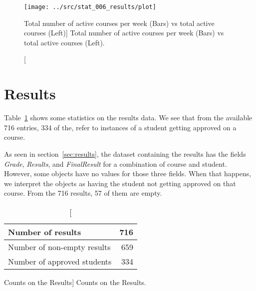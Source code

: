 \begin{figure}[h!]
    \centering

    \texttt{[image: ../src/stat\_006\_results/plot]}

    \caption
        [Total number of active courses per week (Bars) vs total active courses (Left)]
        {Total number of active courses per week (Bars) vs total active courses (Left).}

    \label{fig:stat_006}
\end{figure}

\section{Results}

Table~\ref{tab:results_stats} shows some statistics on the results data. We see
that from the available 716 entries, 334 of the, refer to instances of a
student getting approved on a course.

As seen in section~\ref{sec:results}, the dataset containing the results has
the fields \textit{Grade}, \textit{Results}, and \textit{FinalResult} for a
combination of course and student. However, some objects have no values for
those three fields. When that happens, we interpret the objects as having the
student not getting approved on that course. From the 716 results, 57 of them
are empty.

\begin{table}[h!]
    \centering

    \begin{tabular}{| l | r |}
        \hline
        Number of results           & 716 \\ \hline
        Number of non-empty results & 659  \\ \hline
        Number of approved students & 334 \\ \hline
    \end{tabular}

    \caption
        [Counts on the Results]
        {Counts on the Results.}

    \label{tab:results_stats}
\end{table}
